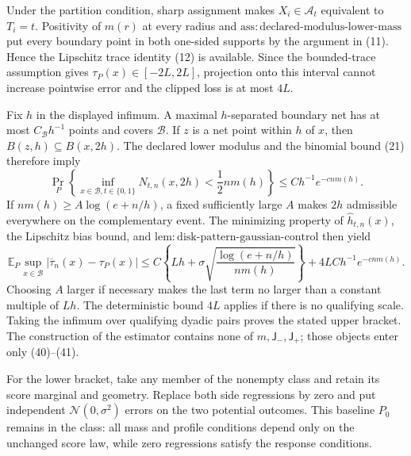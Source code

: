 Under the partition condition, sharp assignment makes \(X_i\in\mathcal A_t\) equivalent to \(T_i=t\).  Positivity of \(m(r)\) at every radius and \(\mathrm{ass:declared\text{-}modulus\text{-}lower\text{-}mass}\) put every boundary point in both one-sided supports by the argument in (11).  Hence the Lipschitz trace identity (12) is available.  Since the bounded-trace assumption gives \(\tau_P(x)\in[-2L,2L]\), projection onto this interval cannot increase pointwise error and the clipped loss is at most \(4L\).

Fix \(h\) in the displayed infimum.  A maximal \(h\)-separated boundary net has at most \(C_{\mathcal B}h^{-1}\) points and covers \(\mathcal B\).  If \(z\) is a net point within \(h\) of \(x\), then \(B(z,h)\subseteq B(x,2h)\).  The declared lower modulus and the binomial bound (21) therefore imply
\[
 \Pr_P\left\{\inf_{x\in\mathcal B,t\in\{0,1\}}N_{t,n}(x,2h)<\frac12nm(h)\right\}
 \le Ch^{-1}e^{-cnm(h)}. \tag{40}
\]
If \(nm(h)\ge A\log(e+n/h)\), a fixed sufficiently large \(A\) makes \(2h\) admissible everywhere on the complementary event.  The minimizing property of \(\widehat h_{t,n}(x)\), the Lipschitz bias bound, and \(\mathrm{lem:disk\text{-}pattern\text{-}gaussian\text{-}control}\) then yield
\[
 \mathbb E_P\sup_{x\in\mathcal B}|\overline\tau_n(x)-\tau_P(x)|
 \le C\left\{Lh+\sigma\sqrt{\frac{\log(e+n/h)}{nm(h)}}\right\}
 +4LCh^{-1}e^{-cnm(h)}. \tag{41}
\]
Choosing \(A\) larger if necessary makes the last term no larger than a constant multiple of \(Lh\).  The deterministic bound \(4L\) applies if there is no qualifying scale.  Taking the infimum over qualifying dyadic pairs proves the stated upper bracket.  The construction of the estimator contains none of \(m,\mathsf J_{-},\mathsf J_{+}\); those objects enter only (40)--(41).

For the lower bracket, take any member of the nonempty class and retain its score marginal and geometry.  Replace both side regressions by zero and put independent \(\mathcal N(0,\sigma^2)\) errors on the two potential outcomes.  This baseline \(P_0\) remains in the class: all mass and profile conditions depend only on the unchanged score law, while zero regressions satisfy the response conditions.


